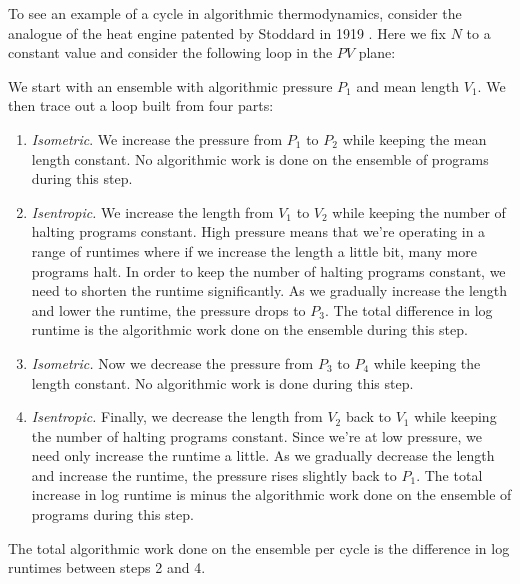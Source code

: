 \documentclass[12pt,twoside,openright]{report}
\begin{document}
To see an example of a cycle in algorithmic thermodynamics, consider the analogue of the heat engine patented by Stoddard in 1919
\cite{Stoddard1919}.  Here we fix $N$ to a constant value and consider the following loop in the $PV$ plane:
\begin{center}
\end{center}
We start with an ensemble with algorithmic pressure $P_1$ and mean length $V_1$.  We then trace out a loop built from four parts:

\begin{enumerate}
  \item 
  \emph{Isometric}. We increase the pressure from $P_1$ to $P_2$ while keeping
  the mean length constant.  No algorithmic work is done on the ensemble
  of programs during this step.
  \item
  \emph{Isentropic.} We increase the length from $V_1$ to $V_2$ while keeping
  the number of halting programs constant.  High pressure means 
  that we're operating in a range of runtimes where if we increase
  the length a little bit, many more programs halt.  In order
  to keep the number of halting programs constant,
  we need to shorten the runtime significantly.  As we gradually
  increase the length and lower the runtime, the pressure drops to $P_3$.
  The total difference in log runtime is the algorithmic 
  work done on the ensemble during this step.
  \item
  \emph{Isometric.} Now we decrease the pressure from $P_3$ to $P_4$ while
  keeping the length constant.  No algorithmic work is done during this step.
  \item
  \emph{Isentropic.} Finally, we decrease the length from $V_2$ back to $V_1$
  while keeping the number of halting programs constant.
  Since we're at low pressure, we need only increase the
  runtime a little.  As we gradually decrease the length
  and increase the runtime, the pressure rises slightly
  back to $P_1$.  The total increase in log runtime is minus the algorithmic
  work done on the ensemble of programs during this step.
\end{enumerate}
The total algorithmic work done on the ensemble per cycle is the difference in log runtimes between steps 2 and 4.
\end{document}
